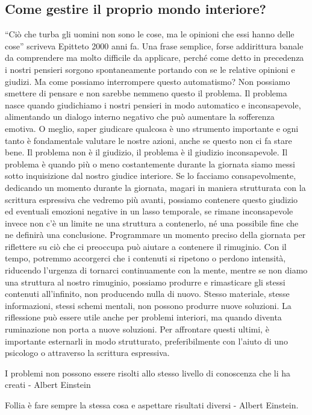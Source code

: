 \documentclass[12pt]{book} %
\begin{document}
\subsection{Come gestire il proprio mondo interiore?}
“Ciò che turba gli uomini non sono le cose, ma le opinioni che essi hanno delle cose” scriveva Epitteto 2000 anni fa.
Una frase semplice, forse addirittura banale da comprendere ma molto difficile da applicare, perché come detto in precedenza i
nostri pensieri sorgono spontaneamente portando con se le relative opinioni e giudizi. Ma come possiamo interrompere
questo automatismo? Non possiamo smettere di pensare e non sarebbe nemmeno questo il problema. 
Il problema nasce quando giudichiamo i nostri pensieri in modo automatico e inconsapevole, alimentando un dialogo interno negativo che può aumentare la sofferenza emotiva. O meglio, saper giudicare qualcosa è uno strumento importante e ogni tanto è
fondamentale valutare le nostre azioni, anche se questo non ci fa stare bene. Il problema non è il giudizio, il
problema è il giudizio inconsapevole. Il problema è quando più o meno costantemente durante la giornata siamo messi
sotto inquisizione dal nostro giudice interiore. Se lo facciamo consapevolmente, dedicando un momento durante la
giornata, magari in maniera strutturata con la scrittura espressiva che vedremo più avanti, possiamo contenere questo
giudizio ed eventuali emozioni negative in un lasso temporale, se rimane inconsapevole invece non
c'è un limite ne una struttura a contenerlo, né una possibile fine che ne definirà una
conclusione. Programmare un momento preciso della giornata per riflettere su ciò che ci preoccupa può aiutare a contenere il rimuginio. Con il tempo, potremmo accorgerci che i contenuti si ripetono o perdono intensità, riducendo l’urgenza di tornarci continuamente con la mente, mentre se non diamo una struttura al nostro rimuginio, possiamo produrre
e rimasticare gli stessi contenuti all'infinito, non producendo nulla di nuovo. Stesso materiale,
stesse informazioni, stessi schemi mentali, non possono produrre nuove soluzioni. 
La riflessione può essere utile anche per problemi interiori, ma quando diventa ruminazione non porta a nuove soluzioni. Per affrontare questi ultimi, è importante esternarli in modo strutturato, preferibilmente con l’aiuto di uno psicologo o attraverso la scrittura espressiva.

I problemi non possono essere risolti allo stesso livello di conoscenza che li ha creati - Albert Einstein

Follia è fare sempre la stessa cosa e aspettare risultati diversi - Albert Einstein.
\end{document}
